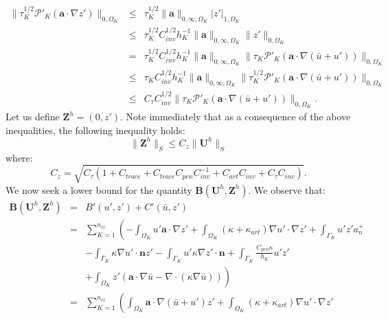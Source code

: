 \documentclass[11pt]{article}
\newenvironment{proof}[1][Proof]{\begin{trivlist}
\item[\hskip \labelsep {\bfseries #1}]}{\end{trivlist}}
\begin{document}
\begin{proof}
\begin{eqnarray}
\| \tau_K^{1/2} \mathcal{P}'_K \left( \bm{a} \cdot \nabla z' \right) \|_{0,\Omega_K} & \leq &  \tau_K^{1/2} \| \bm{a} \|_{0,\infty,\Omega_K} | z' |_{1,\Omega_K} \nonumber \\
& \leq & \tau^{1/2}_{K} C^{1/2}_{inv} h_K^{-1} \| \bm{a} \|_{0,\infty,\Omega_K} \| z' \|_{0,\Omega_K} \nonumber \\
& = & \tau^{1/2}_{K} C^{1/2}_{inv} h_K^{-1} \| \bm{a} \|_{0,\infty,\Omega_K} \| \tau_K \mathcal{P}'_K \left( \bm{a} \cdot \nabla \left( \bar{u} + u' \right) \right) \|_{0,\Omega_K} \nonumber \\
& \leq & \tau_{K} C^{1/2}_{inv} h_K^{-1} \| \bm{a} \|_{0,\infty,\Omega_K} \| \tau^{1/2}_K \mathcal{P}'_K \left( \bm{a} \cdot \nabla \left( \bar{u} + u' \right) \right) \|_{0,\Omega_K} \nonumber \\
& \leq & C_{\tau} C^{1/2}_{inv}  \| \tau_K \mathcal{P}'_K \left( \bm{a} \cdot \nabla \left( \bar{u} + u' \right) \right) \|_{0,\Omega_K}.
\end{eqnarray}
Let us define $\textbf{Z}^h = (0,z')$.  Note immediately that as a consequence of the above inequalities, the following inequality holds:
\begin{equation}
\| \textbf{Z}^h \|_S \leq C_z \| \textbf{U}^h \|_S
\end{equation}
where:
\begin{equation}
C_z = \sqrt{ C_{\tau} \left( 1 + C_{trace} + C_{trace} C_{pen} C^{-1}_{inv} + C_{art} C_{inv} + C_{\tau} C_{inv} \right) }.
\end{equation}
We now seek a lower bound for the quantity $\textbf{B}(\textbf{U}^h,\textbf{Z}^h)$.  We observe that:
\begin{eqnarray}
\textbf{B}(\textbf{U}^h,\textbf{Z}^h) &=& B'(u',z') + C'(\bar{u},z') \nonumber \\
&=& \sum_{K=1}^{n_{el}} \left( -\int_{\Omega_K} u' \bm{a} \cdot \nabla z' + \int_{\Omega_K} \left( \kappa + \kappa_{art} \right) \nabla u' \cdot \nabla z' + \int_{\Gamma_K} u' z' a_n^+ \right. \nonumber \\
& & - \int_{\Gamma_K} \kappa \nabla u' \cdot \bm{n} z' - \int_{\Gamma_K} u' \kappa \nabla z' \cdot \bm{n} + \int_{\Gamma_K} \frac{C_{pen} \kappa}{h_K} u' z' \nonumber \\
&& \left. + \int_{\Omega_K} z' \left( \bm{a} \cdot \nabla \bar{u} - \nabla \cdot \left( \kappa \nabla \bar{u} \right) \right) \right) \nonumber \\
&=& \sum_{K=1}^{n_{el}} \left( \int_{\Omega_K} \bm{a} \cdot \nabla \left( \bar{u} + u' \right) z' + \int_{\Omega_K} \left( \kappa + \kappa_{art} \right) \nabla u' \cdot \nabla z' \right. \nonumber \\

\end{eqnarray}
\end{proof}
\end{document}
